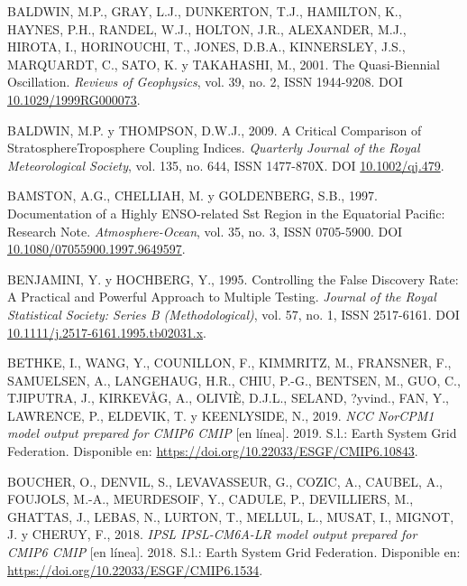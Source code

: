 \documentclass[12pt,oneside,a4paper]{reedthesis}
\newlength{\cslhangindent}
\newenvironment{CSLReferences}[2] %
 {%
  \setlength{\parindent}{0pt}
  \ifodd #1 \everypar{\setlength{\hangindent}{\cslhangindent}}\ignorespaces\fi
  \ifnum #2 > 0
  \setlength{\parskip}{#2\baselineskip}
  \fi
 }%
 {}
\begin{document}
\begin{CSLReferences}{1}{0}
\leavevmode{}%
BALDWIN, M.P., GRAY, L.J., DUNKERTON, T.J., HAMILTON, K., HAYNES, P.H., RANDEL, W.J., HOLTON, J.R., ALEXANDER, M.J., HIROTA, I., HORINOUCHI, T., JONES, D.B.A., KINNERSLEY, J.S., MARQUARDT, C., SATO, K. y TAKAHASHI, M., 2001. The Quasi-Biennial Oscillation. \emph{Reviews of Geophysics}, vol. 39, no. 2, ISSN 1944-9208. DOI \href{https://doi.org/10.1029/1999RG000073}{10.1029/1999RG000073}.

\leavevmode{}%
BALDWIN, M.P. y THOMPSON, D.W.J., 2009. A Critical Comparison of Stratosphere{\textendash}Troposphere Coupling Indices. \emph{Quarterly Journal of the Royal Meteorological Society}, vol. 135, no. 644, ISSN 1477-870X. DOI \href{https://doi.org/10.1002/qj.479}{10.1002/qj.479}.

\leavevmode{}%
BAMSTON, A.G., CHELLIAH, M. y GOLDENBERG, S.B., 1997. Documentation of a Highly {ENSO}-related Sst Region in the Equatorial Pacific: {Research} Note. \emph{Atmosphere-Ocean}, vol. 35, no. 3, ISSN 0705-5900. DOI \href{https://doi.org/10.1080/07055900.1997.9649597}{10.1080/07055900.1997.9649597}.

\leavevmode{}%
BENJAMINI, Y. y HOCHBERG, Y., 1995. Controlling the {False Discovery Rate}: {A Practical} and {Powerful Approach} to {Multiple Testing}. \emph{Journal of the Royal Statistical Society: Series B (Methodological)}, vol. 57, no. 1, ISSN 2517-6161. DOI \href{https://doi.org/10.1111/j.2517-6161.1995.tb02031.x}{10.1111/j.2517-6161.1995.tb02031.x}.

\leavevmode{}%
BETHKE, I., WANG, Y., COUNILLON, F., KIMMRITZ, M., FRANSNER, F., SAMUELSEN, A., LANGEHAUG, H.R., CHIU, P.-G., BENTSEN, M., GUO, C., TJIPUTRA, J., KIRKEVÅG, A., OLIVIÈ, D.J.L., SELAND, ?yvind., FAN, Y., LAWRENCE, P., ELDEVIK, T. y KEENLYSIDE, N., 2019. \emph{NCC NorCPM1 model output prepared for CMIP6 CMIP} {[}en línea{]}. 2019. S.l.: Earth System Grid Federation. Disponible en: \url{https://doi.org/10.22033/ESGF/CMIP6.10843}.

\leavevmode{}%
BOUCHER, O., DENVIL, S., LEVAVASSEUR, G., COZIC, A., CAUBEL, A., FOUJOLS, M.-A., MEURDESOIF, Y., CADULE, P., DEVILLIERS, M., GHATTAS, J., LEBAS, N., LURTON, T., MELLUL, L., MUSAT, I., MIGNOT, J. y CHERUY, F., 2018. \emph{IPSL IPSL-CM6A-LR model output prepared for CMIP6 CMIP} {[}en línea{]}. 2018. S.l.: Earth System Grid Federation. Disponible en: \url{https://doi.org/10.22033/ESGF/CMIP6.1534}.


\end{CSLReferences}
\end{document}
